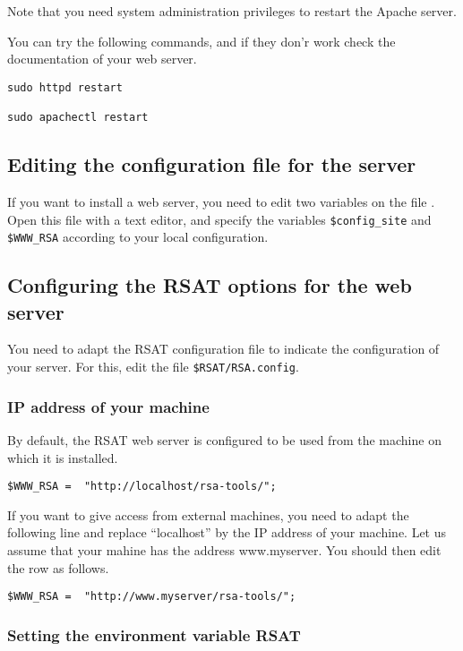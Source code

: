 \documentclass[12pt,a4paper, twoside]{scrreprt} %
\begin{document}
Note that you need system administration privileges to restart the
Apache server.

You can try the following commands, and if they don'r work check the
documentation of your web server.

\begin{verbatim}
sudo httpd restart

sudo apachectl restart
\end{verbatim}

\subsection{Editing the configuration file for the \RSAT server}

If you want to install a web server, you need to edit two variables on
the file . Open this file with a text editor, and
specify the variables \texttt{\$config\_site} and \texttt{\$WWW\_RSA}
according to your local configuration.


\subsection{Configuring the RSAT options for the web server}

You need to adapt the RSAT configuration file to indicate the
configuration of your server. For this, edit the file
\texttt{\$RSAT/RSA.config}.

\subsubsection{IP address of your machine}

By default, the RSAT web server is configured to be used from the
machine on which it is installed. 

\begin{verbatim}
$WWW_RSA = 	"http://localhost/rsa-tools/";
\end{verbatim}

If you want to give access from external machines, you need to adapt
the following line and replace ``localhost'' by the IP address of your
machine. Let us assume that your mahine has the address
www.myserver. You should then edit the row as follows.

\begin{verbatim}
$WWW_RSA = 	"http://www.myserver/rsa-tools/";
\end{verbatim}

\subsubsection{Setting the environment variable RSAT}
\end{document}
